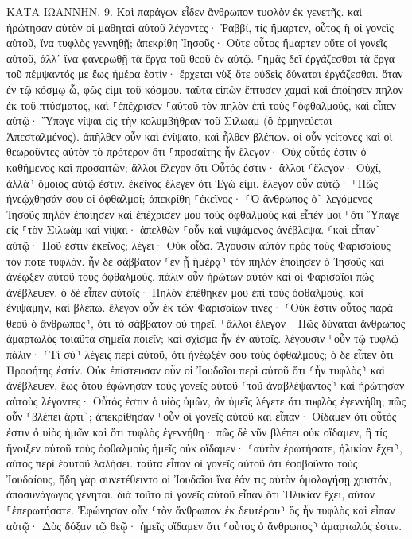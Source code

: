 \documentclass[twoside, 9pt]{extreport}
\begin{document}
ΚΑΤΑ ΙΩΑΝΝΗΝ.
9.
Καὶ παράγων εἶδεν ἄνθρωπον τυφλὸν ἐκ γενετῆς. 
καὶ ἠρώτησαν αὐτὸν οἱ μαθηταὶ αὐτοῦ λέγοντες· Ῥαββί, τίς ἥμαρτεν, οὗτος ἢ οἱ γονεῖς αὐτοῦ, ἵνα τυφλὸς γεννηθῇ; 
ἀπεκρίθη Ἰησοῦς· Οὔτε οὗτος ἥμαρτεν οὔτε οἱ γονεῖς αὐτοῦ, ἀλλ᾽ ἵνα φανερωθῇ τὰ ἔργα τοῦ θεοῦ ἐν αὐτῷ. 
⸀ἡμᾶς δεῖ ἐργάζεσθαι τὰ ἔργα τοῦ πέμψαντός με ἕως ἡμέρα ἐστίν· ἔρχεται νὺξ ὅτε οὐδεὶς δύναται ἐργάζεσθαι. 
ὅταν ἐν τῷ κόσμῳ ὦ, φῶς εἰμι τοῦ κόσμου. 
ταῦτα εἰπὼν ἔπτυσεν χαμαὶ καὶ ἐποίησεν πηλὸν ἐκ τοῦ πτύσματος, καὶ ⸀ἐπέχρισεν ⸀αὐτοῦ τὸν πηλὸν ἐπὶ τοὺς ⸀ὀφθαλμούς, 
καὶ εἶπεν αὐτῷ· Ὕπαγε νίψαι εἰς τὴν κολυμβήθραν τοῦ Σιλωάμ (ὃ ἑρμηνεύεται Ἀπεσταλμένος). ἀπῆλθεν οὖν καὶ ἐνίψατο, καὶ ἦλθεν βλέπων. 
οἱ οὖν γείτονες καὶ οἱ θεωροῦντες αὐτὸν τὸ πρότερον ὅτι ⸀προσαίτης ἦν ἔλεγον· Οὐχ οὗτός ἐστιν ὁ καθήμενος καὶ προσαιτῶν; 
ἄλλοι ἔλεγον ὅτι Οὗτός ἐστιν· ἄλλοι ⸂ἔλεγον· Οὐχί, ἀλλὰ⸃ ὅμοιος αὐτῷ ἐστιν. ἐκεῖνος ἔλεγεν ὅτι Ἐγώ εἰμι. 
ἔλεγον οὖν αὐτῷ· ⸀Πῶς ἠνεῴχθησάν σου οἱ ὀφθαλμοί; 
ἀπεκρίθη ⸀ἐκεῖνος· ⸂Ὁ ἄνθρωπος ὁ⸃ λεγόμενος Ἰησοῦς πηλὸν ἐποίησεν καὶ ἐπέχρισέν μου τοὺς ὀφθαλμοὺς καὶ εἶπέν μοι ⸀ὅτι Ὕπαγε εἰς ⸀τὸν Σιλωὰμ καὶ νίψαι· ἀπελθὼν ⸀οὖν καὶ νιψάμενος ἀνέβλεψα. 
⸂καὶ εἶπαν⸃ αὐτῷ· Ποῦ ἐστιν ἐκεῖνος; λέγει· Οὐκ οἶδα. 
Ἄγουσιν αὐτὸν πρὸς τοὺς Φαρισαίους τόν ποτε τυφλόν. 
ἦν δὲ σάββατον ⸂ἐν ᾗ ἡμέρᾳ⸃ τὸν πηλὸν ἐποίησεν ὁ Ἰησοῦς καὶ ἀνέῳξεν αὐτοῦ τοὺς ὀφθαλμούς. 
πάλιν οὖν ἠρώτων αὐτὸν καὶ οἱ Φαρισαῖοι πῶς ἀνέβλεψεν. ὁ δὲ εἶπεν αὐτοῖς· Πηλὸν ἐπέθηκέν μου ἐπὶ τοὺς ὀφθαλμούς, καὶ ἐνιψάμην, καὶ βλέπω. 
ἔλεγον οὖν ἐκ τῶν Φαρισαίων τινές· ⸂Οὐκ ἔστιν οὗτος παρὰ θεοῦ ὁ ἄνθρωπος⸃, ὅτι τὸ σάββατον οὐ τηρεῖ. ⸀ἄλλοι ἔλεγον· Πῶς δύναται ἄνθρωπος ἁμαρτωλὸς τοιαῦτα σημεῖα ποιεῖν; καὶ σχίσμα ἦν ἐν αὐτοῖς. 
λέγουσιν ⸀οὖν τῷ τυφλῷ πάλιν· ⸂Τί σὺ⸃ λέγεις περὶ αὐτοῦ, ὅτι ἠνέῳξέν σου τοὺς ὀφθαλμούς; ὁ δὲ εἶπεν ὅτι Προφήτης ἐστίν. 
Οὐκ ἐπίστευσαν οὖν οἱ Ἰουδαῖοι περὶ αὐτοῦ ὅτι ⸂ἦν τυφλὸς⸃ καὶ ἀνέβλεψεν, ἕως ὅτου ἐφώνησαν τοὺς γονεῖς αὐτοῦ ⸂τοῦ ἀναβλέψαντος⸃ 
καὶ ἠρώτησαν αὐτοὺς λέγοντες· Οὗτός ἐστιν ὁ υἱὸς ὑμῶν, ὃν ὑμεῖς λέγετε ὅτι τυφλὸς ἐγεννήθη; πῶς οὖν ⸂βλέπει ἄρτι⸃; 
ἀπεκρίθησαν ⸀οὖν οἱ γονεῖς αὐτοῦ καὶ εἶπαν· Οἴδαμεν ὅτι οὗτός ἐστιν ὁ υἱὸς ἡμῶν καὶ ὅτι τυφλὸς ἐγεννήθη· 
πῶς δὲ νῦν βλέπει οὐκ οἴδαμεν, ἢ τίς ἤνοιξεν αὐτοῦ τοὺς ὀφθαλμοὺς ἡμεῖς οὐκ οἴδαμεν· ⸂αὐτὸν ἐρωτήσατε, ἡλικίαν ἔχει⸃, αὐτὸς περὶ ἑαυτοῦ λαλήσει. 
ταῦτα εἶπαν οἱ γονεῖς αὐτοῦ ὅτι ἐφοβοῦντο τοὺς Ἰουδαίους, ἤδη γὰρ συνετέθειντο οἱ Ἰουδαῖοι ἵνα ἐάν τις αὐτὸν ὁμολογήσῃ χριστόν, ἀποσυνάγωγος γένηται. 
διὰ τοῦτο οἱ γονεῖς αὐτοῦ εἶπαν ὅτι Ἡλικίαν ἔχει, αὐτὸν ⸀ἐπερωτήσατε. 
Ἐφώνησαν οὖν ⸂τὸν ἄνθρωπον ἐκ δευτέρου⸃ ὃς ἦν τυφλὸς καὶ εἶπαν αὐτῷ· Δὸς δόξαν τῷ θεῷ· ἡμεῖς οἴδαμεν ὅτι ⸂οὗτος ὁ ἄνθρωπος⸃ ἁμαρτωλός ἐστιν. 
\end{document}
